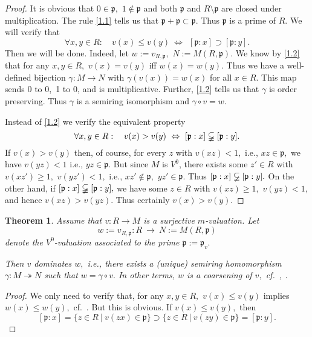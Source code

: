 \documentclass [12pt,a4paper,reqno]{amsart}
\newtheorem{thm}{Theorem} [section]
\begin{document}
\begin{proof}
It is obvious that $0\in {\mathfrak p} ,$ $1\notin{\mathfrak p} $ and both ${\mathfrak p}$
and $R \setminus  {\mathfrak p} $ are closed under multiplication. The rule
\eqref{1.1} tells us that ${\mathfrak p} +{\mathfrak p} \subset {\mathfrak p} .$ Thus ${\mathfrak p} $
is a prime of $R$. We will verify that
\begin{equation}\label{1.2}
\forall x,y\in R:\quad  v(x)\le v(y) {\ {\Leftrightarrow} \ }\ [{\mathfrak p} :
x]\supset[{\mathfrak p} :y].\end{equation} Then we will be done. Indeed,
let $w:=v_{R,{\mathfrak p} },$ $N:=M(R,{\mathfrak p}).$ We know by \eqref{1.2} that
for any $x,y\in R,$ $v(x)=v(y)$ iff $w(x)=w(y).$ Thus we have a
well-defined bijection ${\gamma} : M\to N$ with ${\gamma} (v(x))=w(x)$ for
all $x\in R.$ This map sends 0 to 0,\ 1 to 0, and is
multiplicative. Further, \eqref{1.2} tells us that ${\gamma} $ is order
preserving. Thus ${\gamma} $ is a semiring isomorphism and ${\gamma} \circ
v=w.$

Instead of \eqref{1.2} we verify the equivalent property
$$\forall x,y\in R: \quad v(x)>v(y)\ \Leftrightarrow\ [{\mathfrak p}:x]\varsubsetneqq[{\mathfrak p} :y].$$
If $v(x)>v(y)$ then, of course, for every $z$ with $v(xz)<1, $
i.e., $xz\in {\mathfrak p} ,$ we have $v(yz)< 1$ i.e., $yz\in {\mathfrak p} .$ But
since $M$ is ${V^0}$, there exists some $z'\in R$ with $v(xz')\ge1,$
$v(yz')<1, $ i.e., $xz'\notin {\mathfrak p} ,$ $yz'\in {\mathfrak p} .$ Thus
$[{\mathfrak p}:x]\varsubsetneqq[{\mathfrak p} :y].$ On the other hand, if
$[{\mathfrak p}:x]\varsubsetneqq[{\mathfrak p} :y],$ we have some $z\in R$ with
$v(xz) \geq 1,$ $v(yz) <  1,$ and hence $v(xz) >  v(yz).$ Thus
certainly $v(x) > v(y).$
\end{proof}

\begin{thm}\label{thm1.12}
Assume that $v: R\to M$ is a surjective $m$-valuation. Let
$$w:=v_{R,{\mathfrak p} }:R {\ {\to} \ } N:=M(R,{\mathfrak p})$$ denote the ${V^0}$-valuation
associated to the prime ${\mathfrak p} := {\mathfrak p} _v.$

Then $v$ dominates $w,$ i.e., there exists a (unique) semiring
homomorphism ${\gamma} : M\twoheadrightarrow N$ such that $w={\gamma} \circ
v.$ In other terms, $w$ is a coarsening of $v,$
cf.~\cite[\S2]{IKR1}, \cite{IKR2}.
\end{thm}

\begin{proof} We only need to verify that, for any $x,y\in R,$
$v(x) \leq v(y)$ implies $w(x) \leq w(y),$
cf.~\cite[Definition~2.9]{IKR1}. But this is obvious. If $v(x)
\leq v(y),$ then
$$[{\mathfrak p} :x]=\{z\in R {\ {|} \ } v(zx) \in  {\mathfrak p} \}\supset\{z\in R {\ {|} \ }v(zy)\in  {\mathfrak p}
\}=[{\mathfrak p}:y].$$\end{proof}
\end{document}
